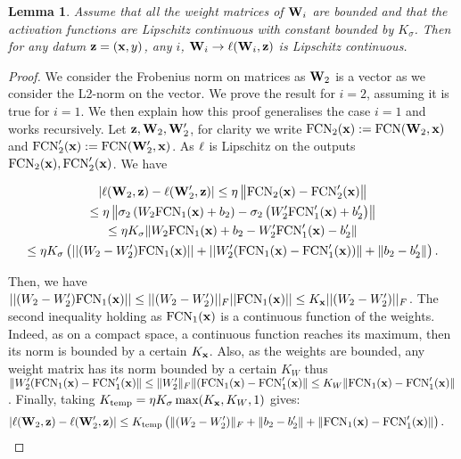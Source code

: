 \documentclass{article}
\newtheorem{lemma}[definition]{Lemma}
\begin{document}
\begin{lemma}
    \label{l:lip-nn}
    Assume that all the weight matrices of $\mathbf{W}_i$ are bounded and that the activation functions are Lipschitz continuous with constant bounded by $K_\sigma$.
    Then for any datum $\mathbf{z}= (\mathbf{x},y)$, any $i$, $\mathbf{W}_i\rightarrow\ell(\mathbf{W}_i,\mathbf{z})$ is Lipschitz continuous.
\end{lemma}
\begin{proof}
    We consider the Frobenius norm on matrices as $\mathbf{W}_2$ is a vector as we consider the L2-norm on the vector.
    We prove the result for $i=2$, assuming it is true for $i=1$. We then explain how this proof generalises the case $i=1$ and works recursively.
    Let $\mathbf{z},\mathbf{W}_2,\mathbf{W}_2'$, for clarity we write $\text{FCN}_2(\mathbf{x}):= \text{FCN}(\mathbf{W}_2,\mathbf{x})$ and $\text{FCN}_2'(\mathbf{x}):= \text{FCN}(\mathbf{W}_2',\mathbf{x})$. 
    As $\ell$ is Lipschitz on the outputs $\text{FCN}_2(\mathbf{x}), \text{FCN}_2'(\mathbf{x})$. 
    We have
    
    \begin{multline*}
        |\ell(\mathbf{W}_2, \mathbf{z}) - \ell(\mathbf{W}'_2, \mathbf{z}) |  \le \eta \left\|\text{FCN}_2(\mathbf{x})-\text{FCN}_2'(\mathbf{x}) \right\| \\
        \le \eta \left\|\sigma_2\left(W_2\text{FCN}_{1}(\mathbf{x}) +b_2 \right) - \sigma_2\left(W_2'\text{FCN}_{1}'(\mathbf{x}) +b_2' \right) \right\| \\
         \le \eta K_{\sigma}\| W_2\text{FCN}_{1}(\mathbf{x}) +b_2 - W_2'\text{FCN}_{1}'(\mathbf{x}) -b_2'\| \\
         \le \eta K_\sigma\left( ||(W_2- W_2') \text{FCN}_{1}(\mathbf{x}) || + ||W_2'(\text{FCN}_{1}(\mathbf{x})-\text{FCN}_{1}'(\mathbf{x}))\| + \|b_2-b_2'\|  \right).
    \end{multline*}
    
    Then, we have $||(W_2- W_2') \text{FCN}_{1}(\mathbf{x}) || \le ||(W_2- W_2')||_F ||\text{FCN}_1(\mathbf{x})|| \le  K_{\mathbf{x}} ||(W_2- W_2')||_F$. The second inequality holding as $\text{FCN}_1(\mathbf{x})$ is a continuous function of the weights. Indeed, as on a compact space, a continuous function reaches its maximum, then its norm is bounded by a certain $K_{\mathbf{x}}$. 
    Also, as the weights are bounded, any weight matrix has its norm bounded by a certain $K_{W}$ thus $\|W_2'(\text{FCN}_{1}(\mathbf{x})-\text{FCN}_{1}'(\mathbf{x})\| \le \|W_2'\|_F\|(\text{FCN}_{1}(\mathbf{x})-\text{FCN}_{1}'(\mathbf{x})\| \le K_{W}\|\text{FCN}_{1}(\mathbf{x})-\text{FCN}_{1}'(\mathbf{x})\|$. Finally, taking $K_{\text{temp}}= \eta K_{\sigma}\max(K_{\mathbf{x}},K_W,1)$ gives: 
    \begin{align*}
        |\ell(\mathbf{W}_2, \mathbf{z}) - \ell(\mathbf{W}'_2, \mathbf{z}) |
        &\le K_{\text{temp}} \left(\|(W_2- W_2')\|_F + \|b_2-b_2'\| + \|\text{FCN}_{1}(\mathbf{x})-\text{FCN}_{1}'(\mathbf{x})\|\right).
    \end{align*}  


\end{proof}
\end{document}
